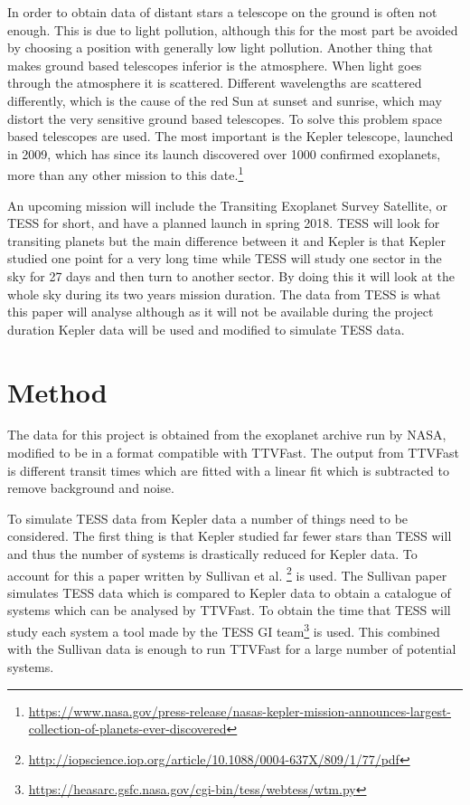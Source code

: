 \documentclass[titlepage]{article}
\begin{document}
	In order to obtain data of distant stars a telescope on the ground is often not enough. This is due to light pollution, although this for the most part be avoided by choosing a position with generally low light pollution. Another thing that makes ground based telescopes inferior is the atmosphere. When light goes through the atmosphere it is scattered. Different wavelengths are scattered differently, which is the cause of the red Sun at sunset and sunrise, which may distort the very sensitive ground based telescopes. To solve this problem space based telescopes are used. The most important is the Kepler telescope, launched in 2009, which has since its launch discovered over 1000 confirmed exoplanets, more than any other mission to this date.\footnote{\url{https://www.nasa.gov/press-release/nasas-kepler-mission-announces-largest-collection-of-planets-ever-discovered}}
	
	An upcoming mission will include the Transiting Exoplanet Survey Satellite, or TESS for short, and have a planned launch in spring 2018. TESS will look for transiting planets but the main difference between it and Kepler is that Kepler studied one point for a very long time while TESS will study one sector in the sky for 27 days and then turn to another sector. By doing this it will look at the whole sky during its two years mission duration. The data from TESS is what this paper will analyse although as it will not be available during the project duration Kepler data will be used and modified to simulate TESS data.
	
\section{Method}
	The data for this project is obtained from the exoplanet archive run by NASA, modified to be in a format compatible with TTVFast. The output from TTVFast is different transit times which are fitted with a linear fit which is subtracted to remove background and noise. 
	
	To simulate TESS data from Kepler data a number of things need to be considered. The first thing is that Kepler studied far fewer stars than TESS will and thus the number of systems is drastically reduced for Kepler data. To account for this a paper written by Sullivan et al. \footnote{\url{http://iopscience.iop.org/article/10.1088/0004-637X/809/1/77/pdf}} is used. The Sullivan paper simulates TESS data which is compared to Kepler data to obtain a catalogue of systems which can be analysed by TTVFast. To obtain the time that TESS will study each system a tool made by the TESS GI team\footnote{\url{https://heasarc.gsfc.nasa.gov/cgi-bin/tess/webtess/wtm.py}} is used. This combined with the Sullivan data is enough to run TTVFast for a large number of potential systems.
	
\end{document}
